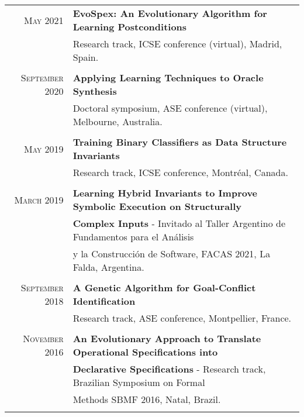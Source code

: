 \documentclass[a4paper,10pt]{article} %
\begin{document}
\begin{longtable}{rl}
\textsc{May} 2021 & \textbf{EvoSpex: An Evolutionary Algorithm for Learning Postconditions} \\ 
& Research track, ICSE conference (virtual), Madrid, Spain. \\ & \\

\textsc{September} 2020 & \textbf{Applying Learning Techniques to Oracle Synthesis} \\ 
& Doctoral symposium, ASE conference (virtual), Melbourne, Australia. \\ & \\

\textsc{May} 2019 & \textbf{Training Binary Classifiers as Data Structure Invariants} \\ 
& Research track, ICSE conference, Montréal, Canada. \\ & \\

\textsc{March} 2019 & \textbf{Learning Hybrid Invariants to Improve Symbolic Execution on Structurally} \\ 
& \textbf{Complex Inputs} - Invitado al Taller Argentino de Fundamentos para el Análisis \\ 
& y la Construcción de Software, FACAS 2021, La Falda, Argentina. \\ & \\

\textsc{September} 2018 & \textbf{A Genetic Algorithm for Goal-Conflict Identification} \\ 
& Research track, ASE conference, Montpellier, France. \\ & \\

\textsc{November} 2016 & \textbf{An Evolutionary Approach to Translate Operational Specifications into} \\
& \textbf{Declarative Specifications} - Research track, Brazilian Symposium on Formal \\ 
& Methods SBMF 2016, Natal, Brazil. \\ & \\

\end{longtable}
\end{document}
